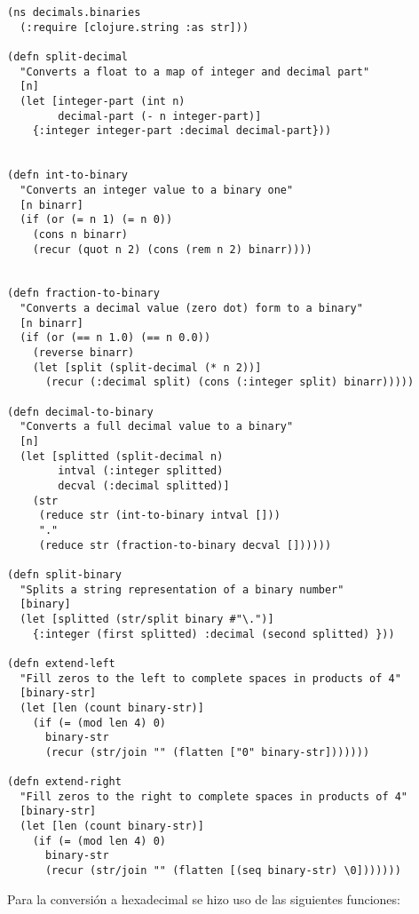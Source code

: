 \documentclass[stu, 12pt, letterpaper, donotrepeattitle, floatsintext, natbib]{apa7}
\begin{document}
\begin{verbatim}
(ns decimals.binaries
  (:require [clojure.string :as str]))

(defn split-decimal
  "Converts a float to a map of integer and decimal part"
  [n]
  (let [integer-part (int n)
        decimal-part (- n integer-part)]
    {:integer integer-part :decimal decimal-part}))


(defn int-to-binary
  "Converts an integer value to a binary one"
  [n binarr]
  (if (or (= n 1) (= n 0))
    (cons n binarr)
    (recur (quot n 2) (cons (rem n 2) binarr))))


(defn fraction-to-binary
  "Converts a decimal value (zero dot) form to a binary"
  [n binarr]
  (if (or (== n 1.0) (== n 0.0))
    (reverse binarr)
    (let [split (split-decimal (* n 2))]
      (recur (:decimal split) (cons (:integer split) binarr)))))

(defn decimal-to-binary
  "Converts a full decimal value to a binary"
  [n]
  (let [splitted (split-decimal n)
        intval (:integer splitted)
        decval (:decimal splitted)]
    (str
     (reduce str (int-to-binary intval []))
     "."
     (reduce str (fraction-to-binary decval [])))))

(defn split-binary 
  "Splits a string representation of a binary number" 
  [binary]
  (let [splitted (str/split binary #"\.")]
    {:integer (first splitted) :decimal (second splitted) }))

(defn extend-left 
  "Fill zeros to the left to complete spaces in products of 4" 
  [binary-str]
  (let [len (count binary-str)]
    (if (= (mod len 4) 0)
      binary-str 
      (recur (str/join "" (flatten ["0" binary-str]))))))

(defn extend-right
  "Fill zeros to the right to complete spaces in products of 4" 
  [binary-str]
  (let [len (count binary-str)]
    (if (= (mod len 4) 0)
      binary-str
      (recur (str/join "" (flatten [(seq binary-str) \0]))))))
\end{verbatim}

Para la conversión a hexadecimal se hizo uso de las siguientes funciones:
\end{document}
